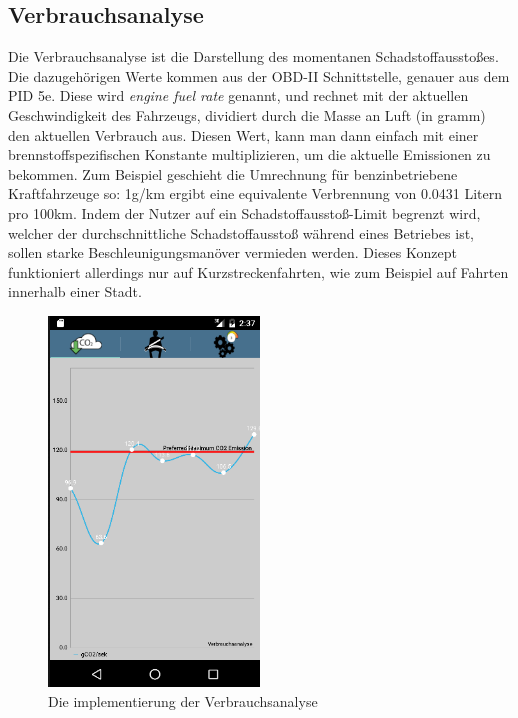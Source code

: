 \subsection{Verbrauchsanalyse}

Die Verbrauchsanalyse ist die Darstellung des momentanen Schadstoffausstoßes.
Die dazugehörigen Werte kommen aus der OBD-II Schnittstelle, genauer aus dem PID 5e.
Diese wird \textit{engine fuel rate} genannt, und rechnet mit der 
aktuellen Geschwindigkeit des Fahrzeugs, dividiert durch die Masse an Luft (in gramm) den aktuellen Verbrauch aus. 
Diesen Wert, kann man dann einfach mit einer brennstoffspezifischen
Konstante multiplizieren, um die aktuelle  Emissionen zu bekommen.
Zum Beispiel geschieht die Umrechnung für benzinbetriebene Kraftfahrzeuge so:
1g/km  ergibt eine equivalente Verbrennung von 0.0431 Litern pro 100km. 
Indem der Nutzer auf ein Schadstoffausstoß-Limit begrenzt wird, welcher der durchschnittliche Schadstoffausstoß während eines Betriebes ist, sollen starke Beschleunigungsmanöver vermieden werden. 
Dieses Konzept funktioniert allerdings nur auf Kurzstreckenfahrten, wie zum Beispiel auf Fahrten innerhalb einer Stadt.
\begin{figure}
    \centering
    \includegraphics[width=0.5\textwidth]{images/verbrauch}
    \caption{Die implementierung der Verbrauchsanalyse \cite{BOZH.ch3-verbrauchsanalyse.verbrauch}}
\end{figure}

